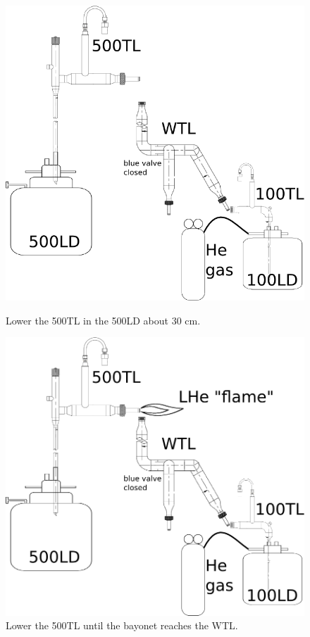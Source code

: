 \begin{figure}[htbp!]
 \centering
 \begin{minipage}{\textwidth}
 \includegraphics[height=.45\textheight]{./img/100LDfill-03-insert-500TL.png}
 \caption{Lower the 500TL in the 500LD about 30 cm.}
 \label{fig:100LDfill-03-insert-500TL}
 \end{minipage}
 \begin{minipage}{\textwidth}
 \includegraphics[height=.45\textheight]{./img/100LDfill-04-insert-500TL.png}
 \caption{Lower the 500TL until the bayonet reaches the WTL.}
 \label{fig:100LDfill-04-insert-500TL}
 \end{minipage}
 \end{figure}

